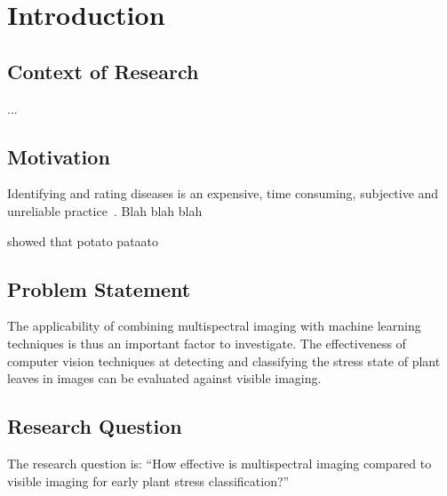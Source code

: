 
\chapter{Introduction} %
\label{Chapter1}


\section{Context of Research}\label{Context}

    ...
    
    

\section{Motivation}\label{Motivation}

    Identifying and rating diseases is an expensive, time consuming, subjective and unreliable practice~\citep{dey2016image}. Blah blah blah
    
    \citet{priya2012efficient} showed that potato pataato



\section{Problem Statement}\label{Statement}

    The applicability of combining multispectral imaging with machine learning techniques is thus an important factor to investigate. The effectiveness of computer vision techniques at detecting and classifying the stress state of plant leaves in images can be evaluated against visible imaging.
       
\section{Research Question}\label{question}

    The research question is: ``How effective is multispectral imaging compared to visible imaging for early plant stress classification?''
    
